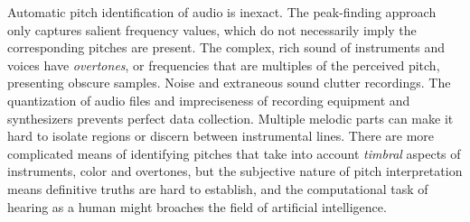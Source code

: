 Automatic pitch identification of audio is inexact. The peak-finding approach only captures salient frequency values, which do not necessarily imply the corresponding pitches are present. The complex, rich sound of instruments and voices have \textit{overtones}, or frequencies that are multiples of the perceived pitch, presenting obscure samples. Noise and extraneous sound clutter recordings. The quantization of audio files and impreciseness of recording equipment and synthesizers prevents perfect data collection. Multiple melodic parts can make it hard to isolate regions or discern between instrumental lines. There are more complicated means of identifying pitches that take into account \textit{timbral} aspects of instruments, color and overtones, but the subjective nature of pitch interpretation means definitive truths are hard to establish, and the computational task of hearing as a human might broaches the field of artificial intelligence.